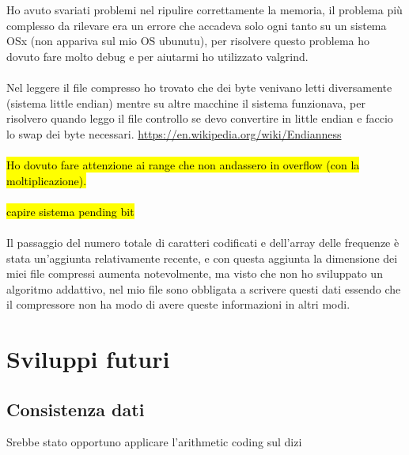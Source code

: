 \documentclass{article}
\begin{document}
Ho avuto svariati problemi nel ripulire correttamente la memoria, il problema più complesso da rilevare era un errore che accadeva solo ogni tanto su un sistema OSx (non appariva sul mio OS ubunutu), per risolvere questo problema ho dovuto fare molto debug e per aiutarmi ho utilizzato valgrind.
\\\\
Nel leggere il file compresso ho trovato che dei byte venivano letti diversamente (sistema little endian) mentre su altre macchine il sistema funzionava, per risolvero quando leggo il file controllo se devo convertire in little endian e faccio lo swap dei byte necessari.
\url{https://en.wikipedia.org/wiki/Endianness}
\\\\
\hl{Ho dovuto fare attenzione ai range che non andassero in overflow (con la moltiplicazione).}
\\\\
\hl{capire sistema pending bit}
\\\\
Il passaggio del numero totale di caratteri codificati e dell'array delle frequenze è stata un'aggiunta relativamente recente, e con questa aggiunta la dimensione dei miei file compressi aumenta notevolmente, ma visto che non ho sviluppato un algoritmo addattivo, nel mio file sono obbligata a scrivere questi dati essendo che il compressore non ha modo di avere queste informazioni in altri modi.

\section{Sviluppi futuri}

\subsection{Consistenza dati}
Srebbe stato opportuno applicare l'arithmetic coding sul dizi
\end{document}

